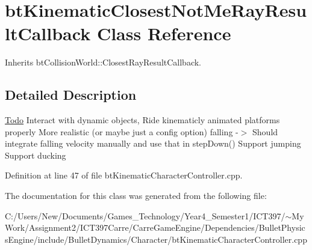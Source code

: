 \hypertarget{classbt_kinematic_closest_not_me_ray_result_callback}{
\section{btKinematicClosestNotMeRayResultCallback Class Reference}
\label{classbt_kinematic_closest_not_me_ray_result_callback}
}
Inherits btCollisionWorld::ClosestRayResultCallback.



\subsection{Detailed Description}
\begin{Desc}
\item[\hyperlink{todo__todo000027}{Todo}]Interact with dynamic objects, Ride kinematicly animated platforms properly More realistic (or maybe just a config option) falling -$>$ Should integrate falling velocity manually and use that in stepDown() Support jumping Support ducking \end{Desc}


Definition at line 47 of file btKinematicCharacterController.cpp.

The documentation for this class was generated from the following file:\begin{CompactItemize}
\item 
C:/Users/New/Documents/Games\_\-Technology/Year4\_\-Semester1/ICT397/$\sim$My Work/Assignment2/ICT397Carre/CarreGameEngine/Dependencies/BulletPhysicsEngine/include/BulletDynamics/Character/btKinematicCharacterController.cpp\end{CompactItemize}
